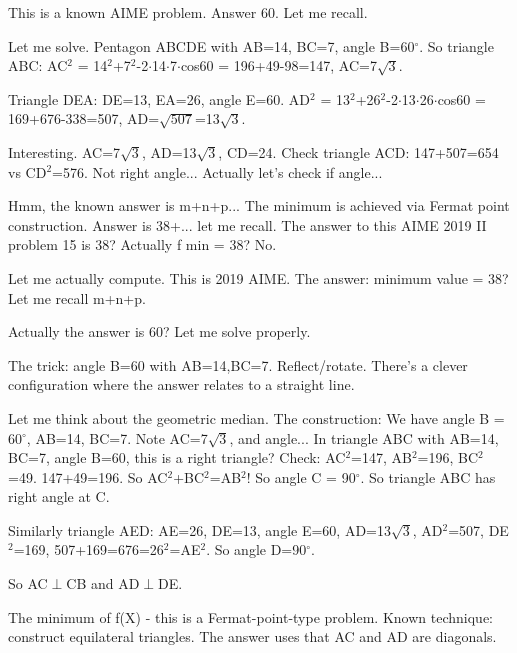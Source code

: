 \begin{decodedreasoningpanel}
  This is a known AIME problem. Answer 60. Let me recall.

Let me solve. Pentagon ABCDE with AB=14, BC=7, angle B=60\ensuremath{^\circ}. So triangle ABC: AC\ensuremath{^2} = 14\ensuremath{^2}+7\ensuremath{^2}-2\ensuremath{\cdot}14\ensuremath{\cdot}7\ensuremath{\cdot}cos60 = 196+49-98=147, AC=7\ensuremath{\sqrt{3}}.

Triangle DEA: DE=13, EA=26, angle E=60. AD\ensuremath{^2} = 13\ensuremath{^2}+26\ensuremath{^2}-2\ensuremath{\cdot}13\ensuremath{\cdot}26\ensuremath{\cdot}cos60 = 169+676-338=507, AD=\ensuremath{\sqrt{507}}=13\ensuremath{\sqrt{3}}.

Interesting. AC=7\ensuremath{\sqrt{3}}, AD=13\ensuremath{\sqrt{3}}, CD=24. Check triangle ACD: 147+507=654 vs CD\ensuremath{^2}=576. Not right angle... Actually let's check if angle... 

Hmm, the known answer is m+n+p... The minimum is achieved via Fermat point construction. Answer is 38+... let me recall. The answer to this AIME 2019 II problem 15 is 38? Actually f min = 38? No.

Let me actually compute. This is 2019 AIME. The answer: minimum value = 38? Let me recall m+n+p.

Actually the answer is 60? Let me solve properly.

The trick: angle B=60 with AB=14,BC=7. Reflect/rotate. There's a clever configuration where the answer relates to a straight line.

Let me think about the geometric median. The construction: We have angle B = 60\ensuremath{^\circ}, AB=14, BC=7. Note AC=7\ensuremath{\sqrt{3}}, and angle... In triangle ABC with AB=14, BC=7, angle B=60, this is a right triangle? Check: AC\ensuremath{^2}=147, AB\ensuremath{^2}=196, BC\ensuremath{^2}=49. 147+49=196. So AC\ensuremath{^2}+BC\ensuremath{^2}=AB\ensuremath{^2}! So angle C = 90\ensuremath{^\circ}. So triangle ABC has right angle at C.

Similarly triangle AED: AE=26, DE=13, angle E=60, AD=13\ensuremath{\sqrt{3}}, AD\ensuremath{^2}=507, DE\ensuremath{^2}=169, 507+169=676=26\ensuremath{^2}=AE\ensuremath{^2}. So angle D=90\ensuremath{^\circ}.

So AC\ensuremath{\perp}CB and AD\ensuremath{\perp}DE.

The minimum of f(X) - this is a Fermat-point-type problem. Known technique: construct equilateral triangles. The answer uses that AC and AD are diagonals.


\end{decodedreasoningpanel}

